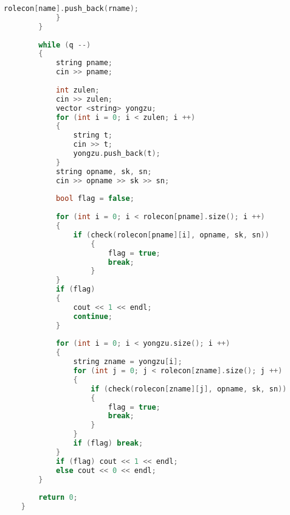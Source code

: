 \begin{lstlisting}[language=C++]
                rolecon[name].push_back(rname);
            }
        }
    
        while (q --)
        {
            string pname;
            cin >> pname;
    
            int zulen;
            cin >> zulen;
            vector <string> yongzu;
            for (int i = 0; i < zulen; i ++)
            {
                string t;
                cin >> t;
                yongzu.push_back(t);
            }
            string opname, sk, sn;
            cin >> opname >> sk >> sn;
    
            bool flag = false;
    
            for (int i = 0; i < rolecon[pname].size(); i ++)
            {
                if (check(rolecon[pname][i], opname, sk, sn))
                    {
                        flag = true;
                        break;
                    }
            }
            if (flag)
            {
                cout << 1 << endl;
                continue;
            }
    
            for (int i = 0; i < yongzu.size(); i ++)
            {
                string zname = yongzu[i];
                for (int j = 0; j < rolecon[zname].size(); j ++)
                {
                    if (check(rolecon[zname][j], opname, sk, sn))
                    {
                        flag = true;
                        break;
                    }
                }
                if (flag) break;
            }
            if (flag) cout << 1 << endl;
            else cout << 0 << endl;
        }
    
        return 0;
    }    
\end{lstlisting}